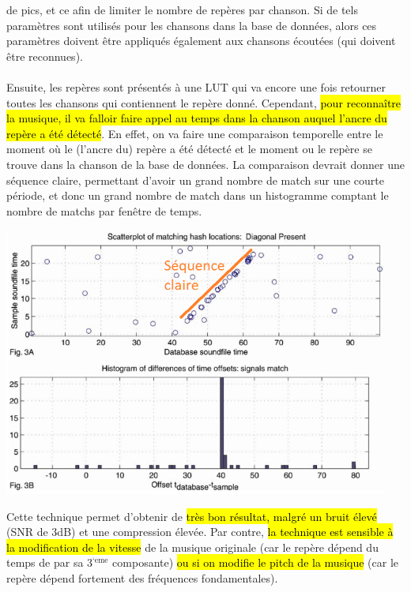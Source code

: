 \documentclass[letterpaper, 12pt]{article}
\newcommand{\alinea}{
\hspace*{0.5cm}}
\begin{document}
				de pics, et ce afin de limiter le nombre de repères par chanson. Si de tels paramètres sont utilisés pour les chansons
				dans la base de données, alors ces paramètres doivent être appliqués également aux chansons écoutées (qui doivent être
				reconnues).\\
			~\\
			\alinea Ensuite, les repères sont présentés à une LUT qui va encore une fois retourner toutes les chansons qui contiennent
				le repère donné. Cependant,\hl{ pour reconnaître la musique, il va falloir faire appel au temps dans la chanson auquel 
				l'ancre du repère a été détecté}. En effet, on va faire une comparaison temporelle entre le moment où le (l'ancre du) 
				repère a été détecté et le moment ou le repère se trouve dans la chanson de la base de données.
				La comparaison devrait donner une séquence claire, permettant d'avoir un grand nombre de match sur une courte période,
				et donc un grand nombre de match dans un histogramme comptant le nombre de matchs par fenêtre de temps.
			\begin{center}
				\includegraphics[width=5in]{Images/landmark2}
			\end{center}
			\alinea Cette technique permet d'obtenir de \hl{très bon résultat, malgré un bruit élevé} (SNR de 3dB) et une compression
				élevée. Par contre, \hl{la technique est sensible à la modification de la vitesse} de la musique originale (car le repère 
				dépend du temps de par sa 3$^{\text{`eme}}$ composante) \hl{ou si on modifie le pitch de la musique} (car le repère dépend
				fortement des fréquences fondamentales).
\end{document}

